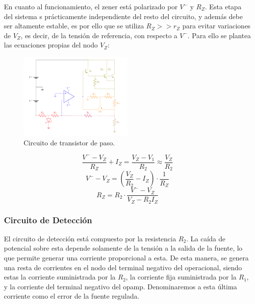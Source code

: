 En cuanto al funcionamiento, el zener está polarizado por $V^{-}$ y $R_Z$. Esta etapa del sistema s prácticamente independiente del resto del circuito, y además debe ser altamente estable, es por ello que se utiliza $R_Z >> r_Z$ para evitar variaciones de $V_Z$, es decir, de la tensión de referencia, con respecto a $V^{-}$. Para ello se plantea las ecuaciones propias del nodo $V_Z$: 
\begin{figure}[H]
\centering
	\includegraphics[width=0.5\textwidth, page=6]{ImagenesEjercicio2/Regulador.pdf}
	\caption{Circuito de transistor de paso.}
	\label{fig:transistorDePaso}
\end{figure}

\begin{equation*}
	\frac{V^{-} - V_Z}{R_Z} + I_Z = \frac{V_Z - V_1}{R_2} \approx \frac{V_Z}{R_2}
\end{equation*}
\begin{equation*}
	V^{-} - V_Z = \left( \frac{V_Z}{R_2} - I_Z \right) \cdot \frac{1}{R_Z}
\end{equation*}
\begin{equation}
	R_Z = R_2 \cdot \frac{V^{-} - V_Z}{V_Z - R_2 I_Z}
	\label{eq:referencia}
\end{equation}

\subsubsection{Circuito de Detección}
\label{sec:circuito-de-deteccion}

El circuito de detección está compuesto por la resistencia $R_2$. La caída de potencial sobre esta depende solamente de la tensión a la salida de la fuente, lo que permite generar una corriente proporcional a esta. De esta manera, se genera una resta de corrientes en el nodo del terminal negativo del operacional, siendo estas la corriente suministrada por la $R_2$, la corriente fija suministrada por la $R_1$, y la corriente del terminal negativo del opamp. Denominaremos a esta última corriente como el error de la fuente regulada.

